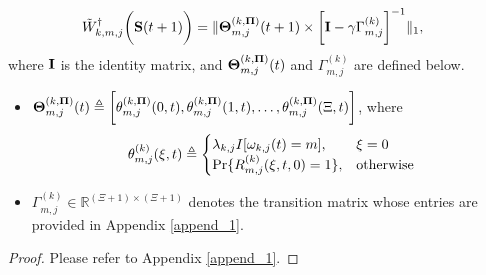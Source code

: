 \begin{lemma}
    \label{lemma:w_ap}
    \begin{align}
        &\tilde{W}^{\dagger}_{k,m,j}\bigg(\mathbf{S}(t+1)\bigg) =
        \lVert
            \boldsymbol{\Theta}^{(k, \boldsymbol{\Pi})}_{m,j}(t+1) \times
            \bigg[
                \mathbf{I} - \gamma \Gamma^{(k)}_{m,j}
            \bigg]^{-1}
        \|_1,
        \label{w_ap}
    \end{align}
    where $\mathbf{I}$ is the identity matrix, and $\boldsymbol{\Theta}^{(k, \boldsymbol{\Pi})}_{m,j}(t)$ and $\Gamma^{(k)}_{m,j}$ are defined below.
    \begin{itemize}
        \item {$\boldsymbol{\Theta}^{(k,\boldsymbol{\Pi})}_{m,j}(t) \triangleq \bigg[
            \theta^{(k,\boldsymbol{\Pi})}_{m,j}(0,t),
            \theta^{(k,\boldsymbol{\Pi})}_{m,j}(1,t),
            \dots,
            \theta^{(k,\boldsymbol{\Pi})}_{m,j}(\Xi,t)
            \bigg]$},
        where 
        \begin{align}
            \theta^{(k)}_{m,j}(\xi,t) \triangleq 
            \begin{cases}
                \lambda_{k,j} I[\omega_{k,j}(t)=m], & \xi=0
                \\
                \Pr\{R^{(k)}_{m,j}(\xi,t,0) = 1\}, & \text{otherwise}
            \end{cases}
        \end{align}
        \item $\Gamma^{(k)}_{m,j} \in \mathbb{R}^{(\Xi+1)\times(\Xi+1)}$ denotes the transition matrix whose entries are provided in Appendix \ref{append_1}.
    \end{itemize}
\end{lemma}
\begin{proof}
    Please refer to Appendix \ref{append_1}.
\end{proof}

